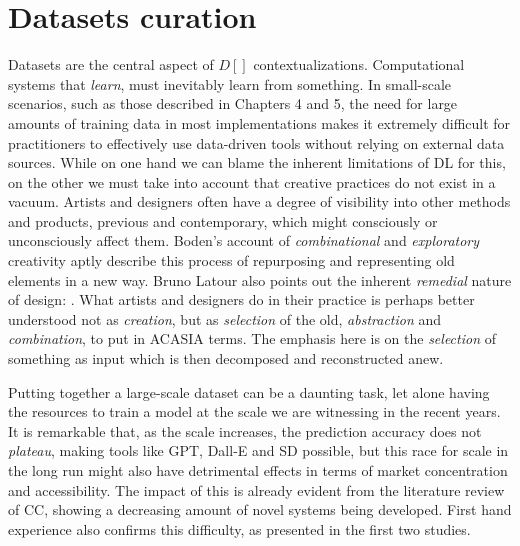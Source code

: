 \section{Datasets curation}\label{sec:datasets-curation}
Datasets are the central aspect of $D[]$ contextualizations. Computational systems that \emph{learn}, must inevitably learn from something. In small-scale scenarios, such as those described in Chapters 4 and 5, the need for large amounts of training data in most implementations makes it extremely difficult for practitioners to effectively use data-driven tools without relying on external data sources. While on one hand we can blame the inherent limitations of DL for this, on the other we must take into account that creative practices do not exist in a vacuum. Artists and designers often have a degree of visibility into other methods and products, previous and contemporary, which might consciously or unconsciously affect them. Boden's \citeyearpar{Boden2003} account of \emph{combinational} and \emph{exploratory} creativity aptly describe this process of repurposing and representing old elements in a new way. Bruno Latour also points out the inherent \emph{remedial} nature of design: . What artists and designers do in their practice is perhaps better understood not as \emph{creation}, but as \emph{selection} of the old, \emph{abstraction} and \emph{combination}, to put in ACASIA terms. The emphasis here is on the \emph{selection} of something as input which is then decomposed and reconstructed anew.

Putting together a large-scale dataset can be a daunting task, let alone having the resources to train a model at the scale we are witnessing in the recent years. It is remarkable that, as the scale increases, the prediction accuracy does not \emph{plateau}, making tools like GPT, Dall-E and SD possible, but this race for scale in the long run might also have detrimental effects in terms of market concentration and accessibility. The impact of this is already evident from the literature review of CC, showing a decreasing amount of novel systems being developed. First hand experience also confirms this difficulty, as presented in the first two studies.

